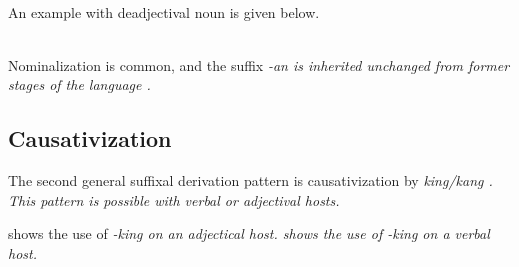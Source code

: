  \\
An example with deadjectival noun is given below.

\\



Nominalization is common, and the suffix \em -an \em is inherited unchanged from former stages of the language \citep{Adelaar1991}.

\subsection{Causativization}\label{sec:wofo:Causativization}
The second general suffixal derivation pattern is causativization by \em king/kang \em {}. This pattern is possible with verbal or adjectival hosts.

 shows the use of \em -king \em on an adjectical host. 
 shows the use of \em -king \em on a verbal host.

